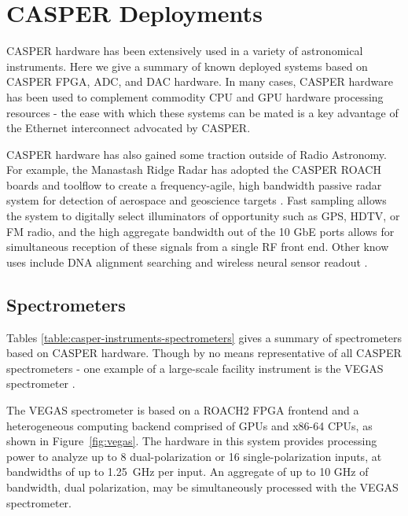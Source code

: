 \documentclass{ws-jai}
\begin{document}
\section{CASPER Deployments} \label{sec:Deployments}

CASPER hardware has been extensively used in a variety of astronomical instruments. Here we give a summary of known deployed systems based on CASPER FPGA, ADC, and DAC hardware. In many cases, CASPER hardware has been used to complement commodity CPU and GPU hardware processing resources - the ease with which these systems can be mated is a key advantage of the Ethernet interconnect advocated by CASPER.

CASPER hardware has also gained some traction outside of Radio Astronomy. For example, the Manastash Ridge Radar has adopted the CASPER ROACH boards and toolflow to create a frequency-agile, high bandwidth passive radar system for detection of aerospace and geoscience targets \cite{vertatschitsch_2013}.  Fast sampling allows the system to digitally select illuminators of opportunity such as GPS, HDTV, or FM radio, and the high aggregate bandwidth out of the 10 GbE ports allows for simultaneous reception of these signals from a single RF front end. Other know uses include DNA alignment searching \citep{roach-blast} and wireless neural sensor readout \citep{implants}.

\subsection{Spectrometers}

Tables \ref{table:casper-instruments-spectrometers} gives a summary of spectrometers based on CASPER hardware. Though by no means representative of all CASPER spectrometers - one example of a large-scale facility instrument is the VEGAS spectrometer \citep{vegas}.

The VEGAS spectrometer is based on a ROACH2 FPGA frontend and a heterogeneous computing backend comprised
of GPUs and x86-64 CPUs, as shown in
Figure~\ref{fig:vegas}. The hardware in this system provides
processing power to analyze up to 8 dual-polarization or 16
single-polarization inputs, at bandwidths of up to 1.25~GHz per
input. An aggregate of up to 10 GHz of bandwidth, dual polarization,
may be simultaneously processed with the VEGAS spectrometer.
\end{document}
